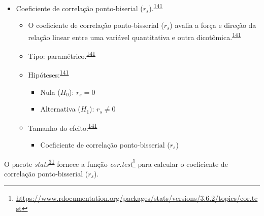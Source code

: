 \documentclass[
  a4paper,
]{book}
\providecommand{\tightlist}{%
  \setlength{\itemsep}{0pt}\setlength{\parskip}{0pt}}
\renewcommand{\href}[2]{#2\footnote{\url{#1}}}
\newenvironment{infobox}[1]
  {
  \begin{itemize}
  \renewcommand{\labelitemi}{
    \raisebox{-.7\height}[0pt][0pt]{
      {\setkeys{Gin}{width=3em,keepaspectratio}
        \texttt{[image: \#1]}}
    }
  }
  \setlength{\fboxsep}{1em}
  \begin{blackbox}
  \item
  }
  {
  \end{blackbox}
  \end{itemize}
  }
\begin{document}
\begin{itemize}
\item
  Coeficiente de correlação ponto-biserial (\(r_{s}\)).\textsuperscript{\protect\hyperlink{ref-khamis2008}{141}}

  \begin{itemize}
  \item
    O coeficiente de correlação ponto-bisserial (\(r_{s}\)) avalia a força e direção da relação linear entre uma variável quantitativa e outra dicotômica.\textsuperscript{\protect\hyperlink{ref-khamis2008}{141}}
  \item
    Tipo: paramétrico.\textsuperscript{\protect\hyperlink{ref-khamis2008}{141}}
  \item
    Hipóteses:\textsuperscript{\protect\hyperlink{ref-khamis2008}{141}}

    \begin{itemize}
    \item
      Nula (\(H_{0}\)): \(r_{s}=0\)
    \item
      Alternativa (\(H_{1}\)): \(r_{s}≠0\)
    \end{itemize}
  \item
    Tamanho do efeito:\textsuperscript{\protect\hyperlink{ref-khamis2008}{141}}

    \begin{itemize}
    \tightlist
    \item
      Coeficiente de correlação ponto-bisserial (\(r_{s}\))
    \end{itemize}
  \end{itemize}
\end{itemize}

\begin{infobox}{images/Rlogo}
O pacote \emph{stats}\textsuperscript{\protect\hyperlink{ref-stats-2}{31}} fornece a função \href{https://www.rdocumentation.org/packages/stats/versions/3.6.2/topics/cor.test}{\emph{cor.test}} para calcular o coeficiente de correlação ponto-bisserial (\(r_{s}\)).

\end{infobox}
\end{document}
